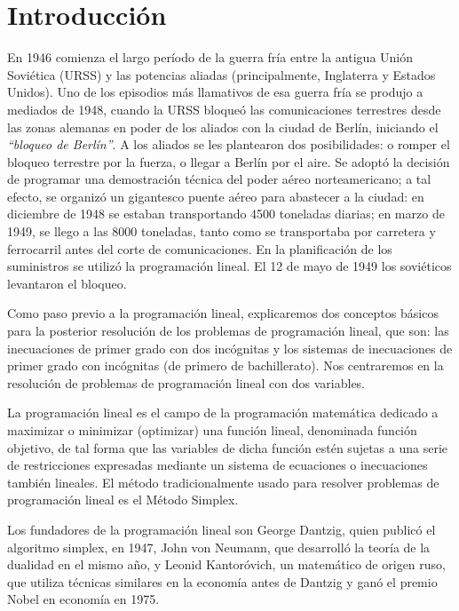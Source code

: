 \section{Introducción}

	\vspace{5mm}


En 1946 comienza el largo período de la guerra fría entre la antigua Unión Soviética (URSS) y las potencias aliadas (principalmente, Inglaterra y Estados Unidos). Uno de los episodios más llamativos de esa guerra fría se produjo a mediados de 1948, cuando la URSS bloqueó las comunicaciones terrestres desde las zonas alemanas en poder de los aliados con la ciudad de Berlín, iniciando el \emph{``bloqueo de Berlín''}. A los aliados se les plantearon dos posibilidades: o romper el bloqueo terrestre por la fuerza, o llegar a Berlín por el aire. Se adoptó la decisión de programar una demostración técnica del poder aéreo norteamericano; a tal efecto, se organizó un gigantesco puente aéreo para abastecer a la ciudad: en diciembre de 1948 se estaban transportando 4500 toneladas diarias; en marzo de 1949, se llego a las 8000 toneladas, tanto como se transportaba por carretera y ferrocarril antes del corte de comunicaciones. En la planificación de los suministros se utilizó la programación lineal. El 12 de mayo de 1949 los soviéticos levantaron el bloqueo.

Como paso previo a la programación lineal, explicaremos dos conceptos básicos para la posterior resolución de los problemas de programación lineal, que son: las inecuaciones de primer grado con dos incógnitas y los sistemas de inecuaciones de primer grado con incógnitas (de primero de bachillerato). Nos centraremos en la resolución de problemas de programación lineal con dos variables.

La programación lineal es el campo de la programación matemática dedicado a maximizar o minimizar (optimizar) una función lineal, denominada función objetivo, de tal forma que las variables de dicha función estén sujetas a una serie de restricciones expresadas mediante un sistema de ecuaciones o inecuaciones también lineales. El método tradicionalmente usado para resolver problemas de programación lineal es el Método Simplex.

Los fundadores de la programación lineal son George Dantzig, quien publicó el algoritmo simplex, en 1947, John von Neumann, que desarrolló la teoría de la dualidad en el mismo año, y Leonid Kantoróvich, un matemático de origen ruso, que utiliza técnicas similares en la economía antes de Dantzig y ganó el premio Nobel en economía en 1975. 

